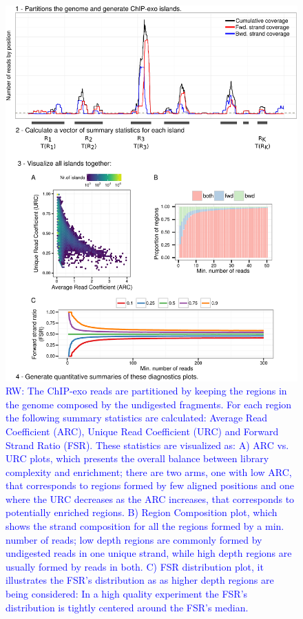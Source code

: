 \documentclass{bmcart}
\newcommand{\RW}[1]{\textcolor{blue}{RW: #1}}
\begin{document}
\begin{figure}[h!]
  \centering
  \includegraphics[width = \textwidth]{figures/fig2/coverage_diagram4.pdf}
  \caption{\RW{The ChIP-exo reads are partitioned by keeping the
      regions in the genome composed by the undigested fragments. For
      each region the following summary statistics are calculated:
      Average Read Coefficient (ARC), Unique Read Coefficient (URC)
      and Forward Strand Ratio (FSR). These statistics are visualized
      as: A) ARC vs. URC plots, which presents the overall balance
      between library complexity and enrichment; there are two arms,
      one with low ARC, that corresponds to regions formed by few
      aligned positions and one where the URC decreases as the ARC
      increases, that corresponds to potentially enriched regions. B)
      Region Composition plot, which shows the strand composition for
      all the regions formed by a min. number of reads; low depth
      regions are commonly formed by undigested reads in one unique
      strand, while high depth regions are usually formed by reads in
      both. C) FSR distribution plot, it illustrates the FSR's
      distribution as as higher depth regions are being considered: In
      a high quality experiment the FSR's distribution is tightly
      centered around the FSR's median.}}


\end{figure}
\end{document}
